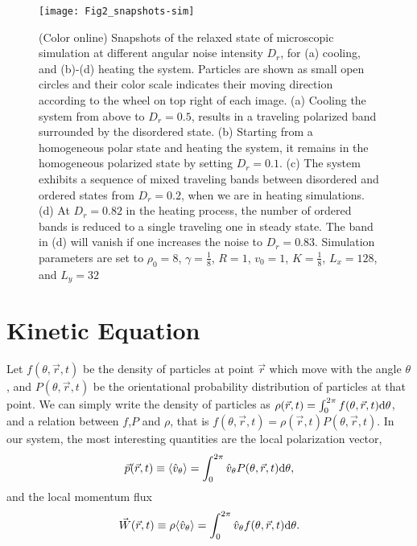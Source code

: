 \documentclass[reprint,floatfix,amsmath,amssymb,aps,pre,showkeys,showpacs,superscriptaddress]{revtex4-1}
\newcommand{\ave}[1]{\langle #1 \rangle}
\newcommand{\p}{p}
\newcommand{\vp}{\vec{\p}}
\newcommand{\w}{W}
\newcommand{\vw}{\vec{\w}}
\newcommand{\dd}{{\rm d}}
\newcommand{\hl}[1]{\textcolor{hlcolor}{#1}}
\begin{document}
\begin{figure}
	\centering
	\texttt{[image: Fig2\_snapshots-sim]}
	\caption{(Color online) Snapshots \hl{of the relaxed state} of microscopic simulation \hl{at different} angular noise intensity $D_r$, for (a) cooling, and (b)-(d) heating the system. Particles are shown as small open circles and their color scale indicates their moving direction according to the wheel on top right of each image. (a) Cooling the system from above to $D_r=0.5$, results in a traveling polarized band surrounded by the disordered state. (b) \hl{Starting from a homogeneous polar state and heating the system, it remains in the homogeneous polarized state by setting $D_r=0.1$. (c) The system exhibits a sequence of mixed traveling bands between disordered and ordered states from $D_r=0.2$, when we are in heating simulations. (d) At $D_r=0.82$ in the heating process, the number of ordered bands is reduced to a single traveling one in steady state}. The band in (d) will vanish if one increases the noise to $D_r=0.83$. Simulation parameters are set to $\rho_0=8$, $\gamma=\tfrac{1}{8}$, $R=1$, $v_0=1$, $K=\tfrac{1}{8}$, $L_x=128$, and $L_y=32$}
\label{fig:snapshots-sim}
\end{figure}

\section{Kinetic Equation}
\label{section:kinetic-theory}

Let $f(\theta,\vec{r},t)$ be the density of particles at point $\vec{r}$ which move with \hl{the} angle $\theta$, and $P(\theta,\vec{r},t)$ be the orientational probability distribution of particles at that point. We can simply write the density of particles as $\rho(\vec{r},t) = \int_{0}^{2\pi} f(\theta,\vec{r},t) \dd \theta$, and a relation between $f$,$P$ and $\rho$, that is $f(\theta,\vec{r},t) = \rho(\vec{r},t) P(\theta,\vec{r},t)$. In our system, the most interesting quantities are the local polarization vector, \hl{
\begin{equation}
\vp(\vec{r},t) \equiv \ave{\hat{v}_{\theta}} = \int_{0}^{2\pi} \hat{v}_{\theta} P(\theta,\vec{r},t) \dd \theta,
\label{eq:local-polarization}
\end{equation}
and the local momentum flux
\begin{equation}
\vw(\vec{r},t) \equiv \rho \ave{\hat{v}_{\theta}} = \int_{0}^{2\pi} \hat{v}_{\theta} f(\theta,\vec{r},t) \dd \theta.
\label{eq:local-w}
\end{equation}
}
\end{document}
